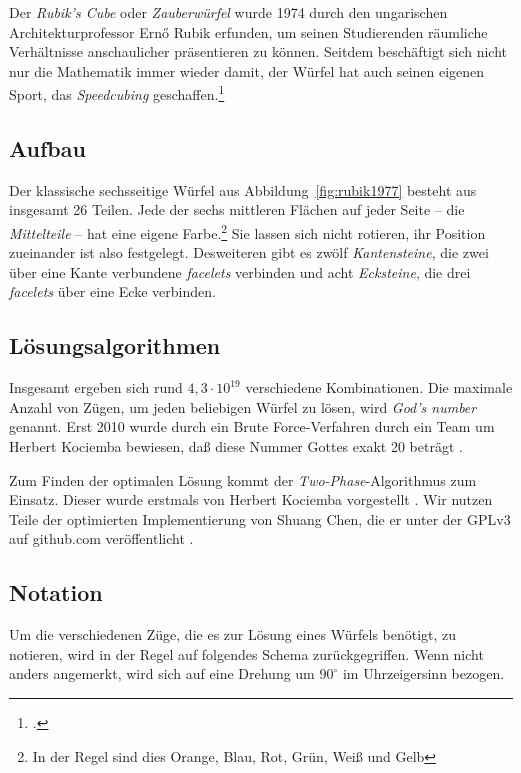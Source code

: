 Der \emph{Rubik's Cube} oder \emph{Zauberwürfel} wurde 1974 durch den
ungarischen Architekturprofessor Ernő Rubik erfunden, um seinen Studierenden
räumliche Verhältnisse anschaulicher präsentieren zu können. Seitdem beschäftigt
sich nicht nur die Mathematik immer wieder damit, der Würfel hat auch seinen
eigenen Sport, das \emph{Speedcubing} geschaffen.\footcite{rubik:history} 

\subsection{Aufbau}  %

Der klassische sechsseitige Würfel aus Abbildung~\ref{fig:rubik1977} besteht aus
insgesamt 26 Teilen. Jede der sechs mittleren Flächen auf jeder Seite – die
\emph{Mittelteile} – hat eine eigene Farbe.\footnote{In der Regel sind dies
Orange, Blau, Rot, Grün, Weiß und Gelb} Sie lassen sich nicht rotieren, ihr
Position zueinander ist also festgelegt. Desweiteren gibt es zwölf
\emph{Kantensteine}, die zwei über eine Kante verbundene \emph{facelets}
verbinden und acht \emph{Ecksteine}, die drei \emph{facelets} über eine Ecke
verbinden.

\subsection{Lösungsalgorithmen}  %

Insgesamt ergeben sich rund \( 4,3 \cdot {10}^{19} \) verschiedene
Kombinationen. Die maximale Anzahl von Zügen, um jeden beliebigen Würfel zu
lösen, wird \emph{God's number} genannt. Erst 2010 wurde durch ein Brute
Force-Verfahren durch ein Team um Herbert Kociemba bewiesen, daß diese Nummer
Gottes exakt 20 beträgt \citep{rubik:godsnumber}.

Zum Finden der optimalen Lösung kommt der \emph{Two-Phase}-Algorithmus zum
Einsatz. Dieser wurde erstmals von Herbert Kociemba vorgestellt
\citep{rubik:kociemba}. Wir nutzen Teile der optimierten Implementierung
von Shuang Chen, die er unter der GPLv3 auf github.com veröffentlicht
\citep{rubik:chen}.


\subsection{Notation}  %

Um die verschiedenen Züge, die es zur Lösung eines Würfels benötigt, zu
notieren, wird in der Regel auf folgendes Schema zurückgegriffen. Wenn nicht
anders angemerkt, wird sich auf eine Drehung um $90^\circ$ im Uhrzeigersinn
bezogen.

